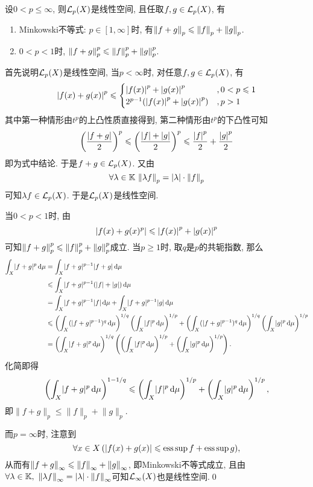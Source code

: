 	\begin{Theorem}
	设$ 0<p\leqslant\infty $, 则$ \mathcal{L}_p(X) $是线性空间, 且任取$ f, g\in\mathcal{L}_p(X) $, 有
	\begin{enumerate}[(1)]
	\item Minkowski不等式: $ p\in[1,\infty] $时, 有$ \left\| f+g \right\|_p\leqslant\left\| f \right\|_p+\left\| g \right\|_p $.
	\item $ 0<p<1 $时, $ \left\| f+g \right\|_p^p\leqslant \left\| f \right\|_p^p+\left\| g \right\|_p^p $.
	\end{enumerate}
	\end{Theorem}
	\begin{Proof}
	首先说明$ \mathcal{L}_p(X) $是线性空间, 当$ p<\infty $时, 对任意$ f, g\in\mathcal{L}_p(X) $, 有
	\[
	\left| f(x)+g(x) \right| ^p\leqslant\begin{cases}
	\left| f(x) \right| ^p+\left| g(x) \right| ^p & ,0<p\leqslant 1\\
	2^{p-1}(\left| f(x) \right| ^p+\left| g(x) \right| ^p) & ,p>1
	\end{cases}
	\]
	其中第一种情形由$ t^p $的上凸性质直接得到, 第二种情形由$ t^p $的下凸性可知
	\[
	\left(\frac{\left| f+g \right| }{2}\right)^p\leqslant\left(\frac{\left| f \right| +\left| g \right| }{2}\right)^p\leqslant\frac{\left| f \right| ^p}{2}+\frac{\left| g \right| ^p}{2}
	\]
	即为式中结论. 于是$ f+g\in\mathcal{L}_p(X) $. 又由
	\[
	\forall\lambda\in\mathbb{K}\,\left\| \lambda f \right\|_p=\left| \lambda \right| \cdot\left\| f \right\|_p
	\]
	可知$ \lambda f\in\mathcal{L}_p(X) $. 于是$ \mathcal{L}_p(X) $是线性空间.
	
	当$ 0<p<1 $时, 由
	\[
		\left| f(x)+g(x)^p \right| \leqslant\left| f(x) \right| ^p+\left| g(x) \right| ^p
	\]
	可知$ \left\| f+g \right\|_p^p\leqslant \left\| f \right\|_p^p+\left\| g \right\|_p^p $成立. 当$ p\geqslant 1 $时, 取$ q $是$ p $的共轭指数, 那么
	\begin{align*}
		\int_X\lvert f+g\rvert^p\,\mathrm{d}\mu&=\int_X\lvert f+g\rvert^{p-1}\lvert f+g\rvert\,\mathrm{d}\mu\\
		&\leqslant\int_X\lvert f+g\rvert^{p-1}(\lvert f\rvert+\lvert g\rvert)\,\mathrm{d}\mu\\
		&=\int_X\lvert f+g\rvert^{p-1}\lvert f\rvert\,\mathrm{d}\mu+\int_X\lvert f+g\rvert^{p-1}\lvert g\rvert\,\mathrm{d}\mu\\
		&\leqslant\left( \int_X(\lvert f+g\rvert^{p-1})^q\,\mathrm{d}\mu \right)^{1/q}\left(\int_X\lvert f\rvert^p\,\mathrm{d}\mu\right)^{1/p}+\left( \int_X(\lvert f+g\rvert^{p-1})^q\,\mathrm{d}\mu \right)^{1/q}\left(\int_X\lvert g\rvert^p\,\mathrm{d}\mu\right)^{1/p}\\
		&=\left( \int_X\lvert f+g\rvert^p\,\mathrm{d}\mu \right)^{1/q}\left( \left( \int_X\lvert f\rvert^p\,\mathrm{d}\mu \right)^{1/p}+\left( \int_X\lvert g\rvert^p\,\mathrm{d}\mu \right)^{1/p} \right).
     \end{align*}
	化简即得
	\[
		\left( \int_X\lvert f+g\rvert^p\,\mathrm{d}\mu \right)^{1-1/q}\leqslant\left( \int_X\lvert f\rvert^p\,\mathrm{d}\mu \right)^{1/p}+\left( \int_X\lvert g\rvert^p\,\mathrm{d}\mu \right)^{1/p},
	\]
	即$ \lVert f+g\rVert_p\leqslant\lVert f\rVert_p+\lVert g\rVert_p $.
	
	而$ p=\infty $时, 注意到
	\[
		\forall x\in X\,(\left| f(x)+g(x) \right| \leqslant\operatorname{ess\,sup} f+\operatorname{ess\,sup} g),
	\]
	从而有$ \left\| f+g \right\|_\infty\leqslant\left\| f \right\|_\infty+\left\| g \right\|_\infty $, 即Minkowski不等式成立, 且由$ \forall\lambda\in\mathbb{K},\ \left\| \lambda f \right\|_\infty=\left| \lambda \right| \cdot\left\| f \right\|_\infty $可知$ \mathcal{L}_\infty(X) $也是线性空间.\qed
	\end{Proof}
	
